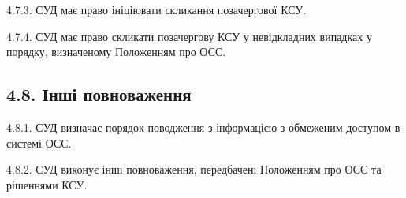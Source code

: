     4.7.3. СУД має право ініціювати скликання позачергової КСУ.

    4.7.4. СУД має право скликати позачергову КСУ у невідкладних випадках у порядку, визначеному Положенням про ОСС.

\subsection*{4.8. Інші повноваження}
    4.8.1. СУД визначає порядок поводження з інформацією з обмеженим доступом в системі ОСС.

    4.8.2. СУД виконує інші повноваження, передбачені Положенням про ОСС та рішеннями КСУ. 